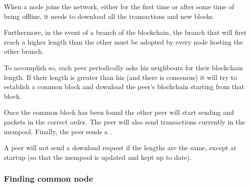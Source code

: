 \documentclass[../documentation.tex]{subfiles}
\begin{document}
When a node joins the network, either for the first time
or after some time of being offline, it needs to download
all the transactions and new blocks.

Furthermore, in the event of a branch of the blockchain, the branch
that will first reach a higher length than the other must be adopted
by every node hosting the other branch.

To accomplish so, each peer periodically asks his neighbours for their blockchain length.
If their length is greater than his (and there is consensus) it will try to establish a common block
and download the peer's blockchain starting from that block.

\begin{center}
\end{center}

Once the common block has been found the other peer will start sending
 and  packets in the correct order.
The peer will also send transactions currently in the mempool. Finally, the peer sends a
.

A peer will not send a download request if the lengths are the same, except
at startup (so that the mempool is updated and kept up to date).

\subsubsection{Finding common node}
\end{document}
